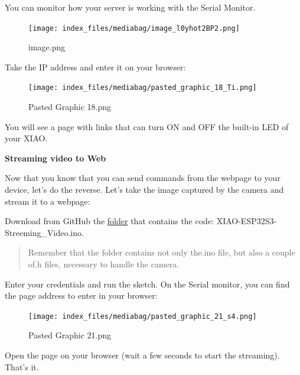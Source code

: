 \documentclass[
  letterpaper,
  DIV=11,
  numbers=noendperiod]{scrreprt}
\begin{document}
You can monitor how your server is working with the Serial Monitor.

\begin{figure}[H]

{\centering \texttt{[image: index\_files/mediabag/image\_l0yhot2BP2.png]}

}

\caption{image.png}

\end{figure}

Take the IP address and enter it on your browser:

\begin{figure}[H]

{\centering \texttt{[image: index\_files/mediabag/pasted\_graphic\_18\_Ti.png]}

}

\caption{Pasted Graphic 18.png}

\end{figure}

You will see a page with links that can turn ON and OFF the built-in LED
of your XIAO.

\textbf{Streaming video to Web}

Now that you know that you can send commands from the webpage to your
device, let's do the reverse. Let's take the image captured by the
camera and stream it to a webpage:

Download from GitHub the
\href{https://github.com/Mjrovai/XIAO-ESP32S3-Sense/tree/main/Streeming_Video}{folder}
that contains the code: XIAO-ESP32S3-Streeming\_Video.ino.

\begin{quote}
Remember that the folder contains not only the.ino file, but also a
couple of.h files, necessary to handle the camera.
\end{quote}

Enter your credentials and run the sketch. On the Serial monitor, you
can find the page address to enter in your browser:

\begin{figure}[H]

{\centering \texttt{[image: index\_files/mediabag/pasted\_graphic\_21\_s4.png]}

}

\caption{Pasted Graphic 21.png}

\end{figure}

Open the page on your browser (wait a few seconds to start the
streaming). That's it.
\end{document}
